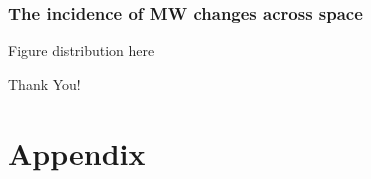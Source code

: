 \documentclass[aspectratio=169, t]{beamer}
\begin{document}
\begin{frame}
	\frametitle{The incidence of MW changes across space}
	
	Figure distribution here
\end{frame}

\begin{frame}[c]
    \begin{center}
    	\Large Thank You!
    \end{center}
\end{frame}


\appendix

\renewcommand\thetable{\thesection.\arabic{table}} 
\renewcommand\thefigure{\thesection.\arabic{figure}} 
\setcounter{table}{0}
\setcounter{figure}{0}

\section{Appendix}
\end{document}
